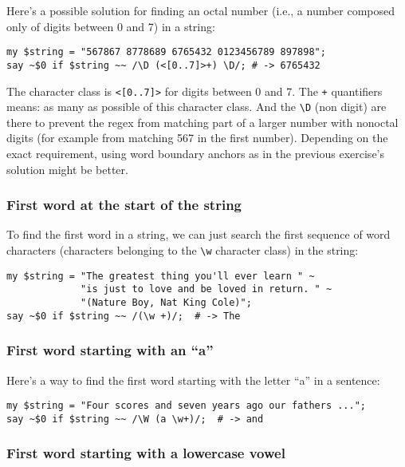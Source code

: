 Here's a possible solution for finding an octal number (i.e., 
a number composed only of digits between 0 and 7) in 
a string:

\begin{verbatim}
my $string = "567867 8778689 6765432 0123456789 897898";
say ~$0 if $string ~~ /\D (<[0..7]>+) \D/; # -> 6765432
\end{verbatim}

The character class is \verb'<[0..7]>' for digits between 
0 and 7. The \verb'+' quantifiers means: as many as possible 
of this character class. And the \verb'\D' (non digit) are 
there to prevent the regex from matching part of a larger 
number with nonoctal digits (for example from matching 567 
in the first number). Depending on the exact requirement, 
using word boundary anchors as in the previous exercise's 
solution might be better.

\subsubsection{First word at the start of the string}

To find the first word in a string, we can just search the 
first sequence of word characters (characters belonging to 
the \verb'\w' character class) in the string:

\begin{verbatim}
my $string = "The greatest thing you'll ever learn " ~
             "is just to love and be loved in return. " ~
             "(Nature Boy, Nat King Cole)";
say ~$0 if $string ~~ /(\w +)/;  # -> The
\end{verbatim}


\subsubsection{First word starting with an ``a''}

Here's a way to find the first word starting with the letter 
``a'' in a sentence:

\begin{verbatim}
my $string = "Four scores and seven years ago our fathers ...";
say ~$0 if $string ~~ /\W (a \w+)/;  # -> and
\end{verbatim}

\subsubsection{First word starting with a lowercase vowel}

